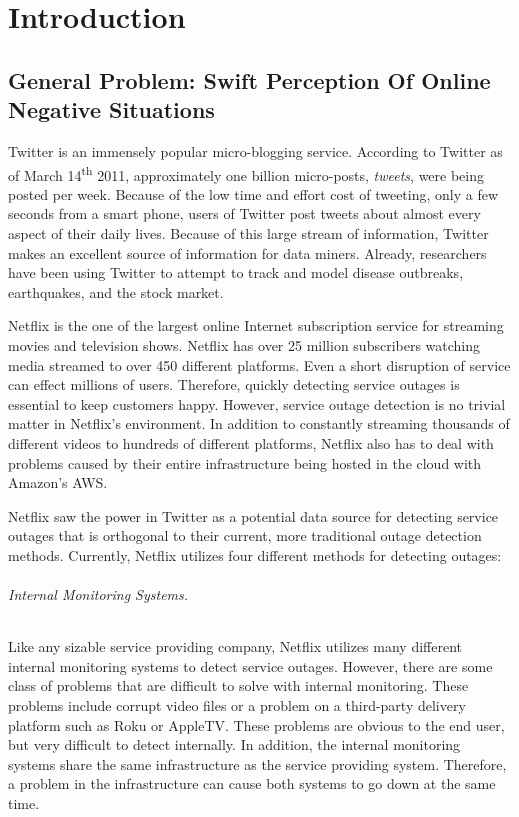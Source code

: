 \documentclass[12pt]{ucthesis}
\begin{document}
\pagestyle{plain}

\renewcommand{\baselinestretch}{1.66}

\part{Introduction}
\label{introduction}

\chapter{General Problem: Swift Perception Of Online Negative Situations}
\label{general-problem}

Twitter is an immensely popular micro-blogging service. According to Twitter as of March 14\textsuperscript{th} 2011,
approximately one billion micro-posts, \emph{tweets}, were being posted per week\cite{TwitterBlog}.
Because of the low time and effort cost of tweeting, only a few seconds from a smart phone,
users of Twitter post tweets about almost every aspect of their daily lives.
Because of this large stream of information, Twitter makes an excellent source of information for
data miners. Already, researchers have been using Twitter to attempt to track and model
disease outbreaks\cite{DetectingInfluenza}, earthquakes\cite{Earthquakes}, and the
stock market\cite{StockMarket}.

Netflix is the one of the largest online Internet subscription service for streaming movies and
television shows. Netflix has over 25 million subscribers watching media streamed to over 450 different
platforms. Even a short disruption of service can effect millions of users. Therefore, quickly detecting service outages
is essential to keep customers happy. However, service outage detection is no trivial matter in Netflix's
environment. In addition to constantly streaming thousands of different videos to hundreds of different platforms,
Netflix also has to deal with problems caused by their entire infrastructure being hosted in the cloud with Amazon's
AWS.

Netflix saw the power in Twitter as a potential data source for detecting service outages that
is orthogonal to their current, more traditional outage detection methods. Currently, Netflix utilizes four
different methods for detecting outages:

\paragraph{Internal Monitoring Systems.}
Like any sizable service providing company, Netflix utilizes many different internal monitoring
systems to detect service outages. However, there are some class of problems that are difficult to solve
with internal monitoring. These problems include corrupt video files or a problem on a third-party delivery
platform such as Roku or AppleTV. These problems are obvious to the end user, but very difficult to detect internally.
In addition, the internal monitoring systems share the same infrastructure as the service providing system. Therefore,
a problem in the infrastructure can cause both systems to go down at the same time.
\end{document}

